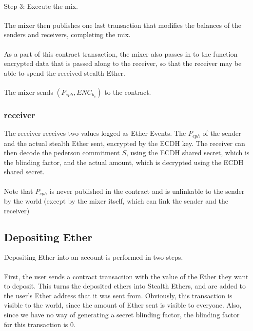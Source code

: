\documentclass{article}
\begin{document}
\paragraph{}
Step 3: Execute the mix.
\paragraph{}
The mixer then publishes one last transaction that modifies the balances of the senders and receivers, completing the mix. 
\paragraph{}
As a part of this contract transaction, the mixer also passes in to the function encrypted data that is passed along to the receiver, so that the receiver may be able to spend the received stealth Ether. 
\paragraph{}
The mixer sends $(P_{eph}, ENC_{b_s})$ to the contract. 

\subsubsection{receiver}
The receiver receives two values logged as Ether Events. The $P_{eph}$ of the sender and the actual stealth Ether sent, encrypted by the ECDH key. The receiver can then decode the pederson commitment $S$, using the ECDH shared secret, which is the blinding factor, and the actual amount, which is decrypted using the ECDH shared secret. 
\paragraph{}
Note that $P_{eph}$ is never published in the contract and is unlinkable to the sender by the world (except by the mixer itself, which can link the sender and the receiver)

\subsection{Depositing Ether}
Depositing Ether into an account is performed in two steps. 
\paragraph{}
First, the user sends a contract transaction with the value of the Ether they want to deposit. This turns the deposited ethers into Stealth Ethers, and are added to the user's Ether address that it was sent from. Obviously, this transaction is visible to the world, since the amount of Ether sent is visible to everyone. Also, since we have no way of generating a secret blinding factor, the blinding factor for this transaction is 0. 
\end{document}
